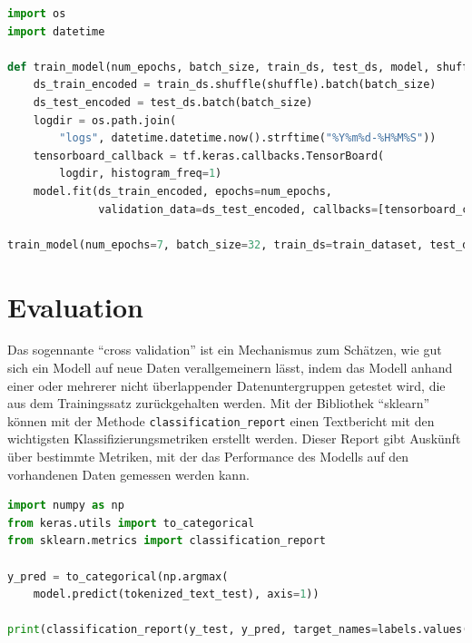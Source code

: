 \begin{lstlisting}[language=Python,caption=Das Training des Models, label={TrainModel}]
import os
import datetime

def train_model(num_epochs, batch_size, train_ds, test_ds, model, shuffle):
    ds_train_encoded = train_ds.shuffle(shuffle).batch(batch_size)
    ds_test_encoded = test_ds.batch(batch_size)
    logdir = os.path.join(
        "logs", datetime.datetime.now().strftime("%Y%m%d-%H%M%S"))
    tensorboard_callback = tf.keras.callbacks.TensorBoard(
        logdir, histogram_freq=1)
    model.fit(ds_train_encoded, epochs=num_epochs,
              validation_data=ds_test_encoded, callbacks=[tensorboard_callback])
    
train_model(num_epochs=7, batch_size=32, train_ds=train_dataset, test_ds=test_dataset, model=model, shuffle=1000)
\end{lstlisting}





\section{Evaluation}\label{evaSec}

Das sogennante \enquote{cross validation} ist ein Mechanismus zum Schätzen, wie gut sich ein Modell auf neue Daten verallgemeinern lässt, indem das Modell anhand einer oder mehrerer nicht überlappender Datenuntergruppen getestet wird, die aus dem Trainingssatz zurückgehalten werden. Mit der Bibliothek \enquote{sklearn} können mit der Methode \texttt{classification\_report} einen Textbericht mit den wichtigsten Klassifizierungsmetriken erstellt werden. Dieser Report gibt Auskünft über bestimmte Metriken, mit der das Performance des Modells auf den vorhandenen Daten gemessen werden kann. 

\begin{lstlisting}[language=Python,caption=Das Evaluieren des Models, label={TrainModel}]
import numpy as np
from keras.utils import to_categorical
from sklearn.metrics import classification_report

y_pred = to_categorical(np.argmax(
    model.predict(tokenized_text_test), axis=1))

print(classification_report(y_test, y_pred, target_names=labels.values(), digits=4))
\end{lstlisting}



